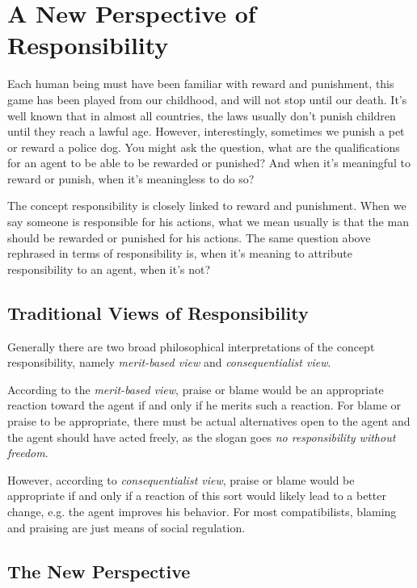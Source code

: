 \section{A New Perspective of Responsibility}

Each human being must have been familiar with reward and punishment, this game has been played from our childhood, and will not stop until our death. It’s well known that in almost all countries, the laws usually don’t punish children until they reach a lawful age. However, interestingly, sometimes we punish a pet or reward a police dog. You might ask the question, what are the qualifications for an agent to be able to be rewarded or punished? And when it’s meaningful to reward or punish, when it’s meaningless to do so?

The concept responsibility is closely linked to reward and punishment. When we say someone is responsible for his actions, what we mean usually is that the man should be rewarded or punished for his actions. The same question above rephrased in terms of responsibility is, when it’s meaning to attribute responsibility to an agent, when it’s not?

\subsection{Traditional Views of Responsibility}

Generally there are two broad philosophical interpretations of the concept responsibility, namely \emph{merit-based view} and \emph{consequentialist view}\cite{sep-moral-responsibility}.

According to the \emph{merit-based view}, praise or blame would be an appropriate reaction toward the agent if and only if he merits such a reaction. For blame or praise to be appropriate, there must be actual alternatives open to the agent and the agent should have acted freely, as the slogan goes \emph{no responsibility without freedom}.

However, according to \emph{consequentialist view}, praise or blame would be appropriate if and only if a reaction of this sort would likely lead to a better change, e.g. the agent improves his behavior. For most compatibilists, blaming and praising are just means of social regulation.

\subsection{The New Perspective}

